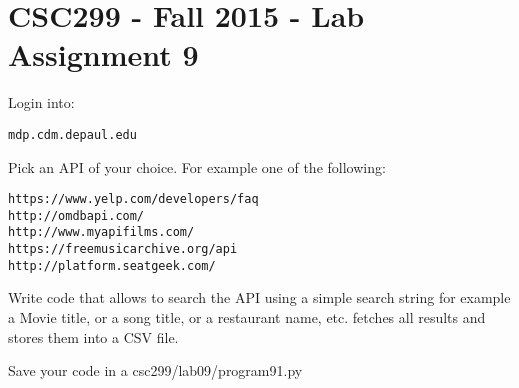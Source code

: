 \documentclass[12pt]{article}
\begin{document}
\section{CSC299 - Fall 2015 - Lab Assignment 9}

\noindent Login into:
\begin{verbatim}
mdp.cdm.depaul.edu
\end{verbatim}

Pick an API of your choice. For example one of the following:

\begin{verbatim}
https://www.yelp.com/developers/faq
http://omdbapi.com/
http://www.myapifilms.com/
https://freemusicarchive.org/api
http://platform.seatgeek.com/
\end{verbatim}

Write code that allows to search the API using a simple search string for example a Movie title, or a song title, or a restaurant name, etc. fetches all results and stores them into a CSV file.

Save your code in a csc299/lab09/program91.py
\end{document}
